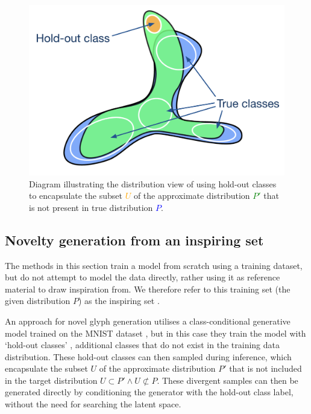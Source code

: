 \begin{figure}[!htbp]
    \centering
    \includegraphics[width=1\textwidth]{figures/c6_active_div/diagrams/hold_out.png}
    \caption[Novelty search over learned representations using hold-out classes]{Diagram illustrating the distribution view of using hold-out classes to encapsulate the subset \textcolor{orange}{$U$} of the approximate distribution \textcolor{green}{$P'$} that is not present in true distribution \textcolor{blue}{$P$}.}
  \label{fig:c6:novelty-search-hold-out}
  \end{figure}

\subsection{Novelty generation from an inspiring set}
\label{survey:noveltygeneration}

The methods in this section train a model from scratch using a training dataset, but do not attempt to model the data directly, rather using it as reference material to draw inspiration from. 
We therefore refer to this training set (the given distribution $P$) as the inspiring set \citep{ritchie2007some}.

An approach for novel glyph generation utilises a class-conditional generative model trained on the MNIST dataset \citep{lecun1998gradient}, but in this case they train the model with `hold-out classes' \citep{cherti2017out}, additional classes that do not exist in the training data distribution. 
These hold-out classes can then sampled during inference, which encapsulate the subset $U$ of the approximate distribution $P'$ that is not included in the target distribution $U \subset P' \wedge U \not\subset P$. 
These divergent samples can then be generated directly by conditioning the generator with the hold-out class label, without the need for searching the latent space. 

